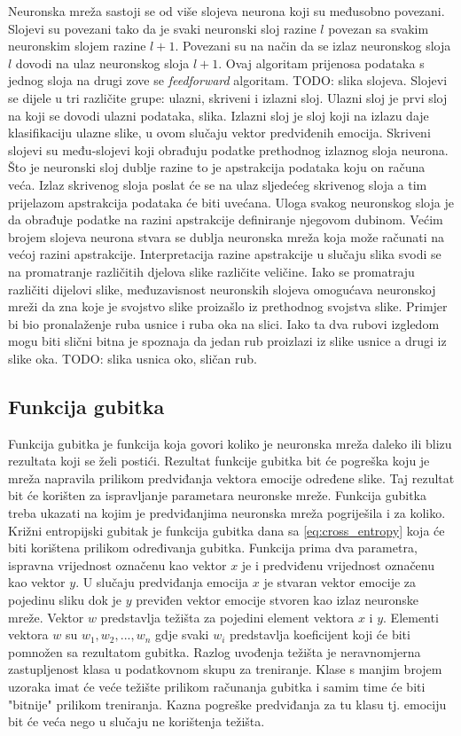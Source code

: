 \documentclass[times, utf8, zavrsni,numeric,pstricks]{fer}
\begin{document}
Neuronska mreža sastoji se od više slojeva neurona koji su međusobno povezani. Slojevi su povezani tako da je svaki neuronski sloj razine $l$ povezan sa svakim neuronskim slojem razine $l+1$. Povezani su na način da se izlaz neuronskog sloja $l$ dovodi na ulaz neuronskog sloja $l+1$. Ovaj algoritam prijenosa podataka s jednog sloja na drugi zove se \textit{feedforward} algoritam. TODO: slika slojeva. Slojevi se dijele u tri različite grupe: ulazni, skriveni i izlazni sloj. Ulazni sloj je prvi sloj na koji se dovodi ulazni podataka, slika. Izlazni sloj je sloj koji na izlazu daje klasifikaciju ulazne slike, u ovom slučaju vektor predviđenih emocija. Skriveni slojevi su među-slojevi koji obrađuju podatke prethodnog izlaznog sloja neurona. Što je neuronski sloj dublje razine to je apstrakcija podataka koju on računa veća. Izlaz skrivenog sloja poslat će se na ulaz sljedećeg skrivenog sloja a tim prijelazom apstrakcija podataka će biti uvećana. Uloga svakog neuronskog sloja je da obrađuje podatke na razini apstrakcije definiranje njegovom dubinom. Većim brojem slojeva neurona stvara se dublja neuronska mreža koja može računati na većoj razini apstrakcije. Interpretacija razine apstrakcije u slučaju slika svodi se na promatranje različitih djelova slike različite veličine. Iako se promatraju različiti dijelovi slike, međuzavisnost neuronskih slojeva omogućava neuronskoj mreži da zna koje je svojstvo slike proizašlo iz prethodnog svojstva slike. Primjer bi bio pronalaženje ruba usnice i ruba oka na slici. Iako ta dva rubovi izgledom mogu biti slični bitna je spoznaja da jedan rub proizlazi iz slike usnice a drugi iz slike oka. TODO: slika usnica oko, sličan rub.


\subsection{Funkcija gubitka}
Funkcija gubitka  je funkcija koja govori koliko je neuronska mreža daleko ili blizu rezultata koji se želi postići. Rezultat funkcije gubitka bit će pogreška koju je mreža napravila prilikom predviđanja vektora emocije određene slike. Taj rezultat bit će korišten za ispravljanje parametara neuronske mreže. Funkcija gubitka treba ukazati na kojim je predviđanjima neuronska mreža pogriješila i za koliko. Križni entropijski gubitak  je funkcija gubitka dana sa \ref{eq:cross_entropy} koja će biti korištena prilikom određivanja gubitka. Funkcija prima dva parametra, ispravna vrijednost označenu kao vektor $x$ je i predviđenu vrijednost označenu kao vektor $y$. U slučaju predviđanja emocija $x$ je stvaran vektor emocije za pojedinu sliku dok je $y$ previđen vektor emocije stvoren kao izlaz neuronske mreže. Vektor $w$ predstavlja težišta za pojedini element vektora $x$ i $y$. Elementi vektora $w$ su $w_1, w_2, ..., w_n$ gdje svaki $w_i$ predstavlja koeficijent koji će biti pomnožen sa rezultatom gubitka. Razlog uvođenja težišta je neravnomjerna zastupljenost klasa u podatkovnom skupu za treniranje. Klase s manjim brojem uzoraka imat će veće težište prilikom računanja gubitka i samim time će biti "bitnije" prilikom treniranja. Kazna pogreške predviđanja za tu klasu tj. emociju bit će veća nego u slučaju ne korištenja težišta.
\end{document}
